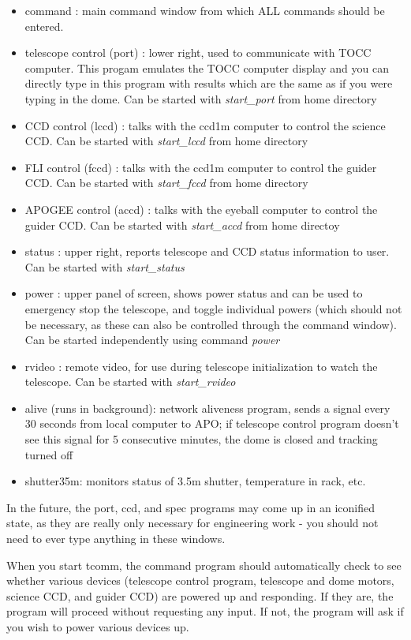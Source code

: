 \documentclass[10pt]{report}
\begin{document}
\begin{itemize}
\item command : main command window from which ALL commands should
              be entered.
\item telescope control (port) : lower right, used to communicate with TOCC
              computer. This progam emulates the TOCC computer display and
              you can directly type in this program with results which are
              the same as if you were typing in the dome. Can be started with
              \textit{start\_port} from home directory
\item CCD control (lccd) : talks with the ccd1m computer to control the science CCD. Can be started with \textit{start\_lccd} from home directory
\item FLI control (fccd) : talks with the ccd1m computer to control the guider CCD. Can be started with \textit{start\_fccd} from home directory
\item APOGEE control (accd) : talks with the eyeball computer to control the guider CCD. Can be started with \textit{start\_accd} from home directoy
\item status : upper right, reports telescope and CCD status information to user. Can be started with \textit{start\_status}
\item power : upper panel of screen, shows power status and can be used to
emergency stop the telescope, and toggle individual powers (which should not
be necessary, as these can also be controlled through the command window).
Can be started independently using command \textit{power}
\item rvideo : remote video, for use during telescope initialization to watch
the telescope. Can be started with \textit{start\_rvideo}
\item alive (runs in background): network aliveness program, sends a signal 
every 30 seconds from
local computer to APO; if telescope control program doesn't see this signal
for 5 consecutive minutes, the dome is closed and tracking turned off
\item shutter35m: monitors status of 3.5m shutter, temperature in rack, etc.
\end{itemize}

In the future, the port, ccd, and spec programs may come up in an iconified
state, as they are really only necessary for engineering work - you should
not need to ever type anything in these windows.

When you start tcomm, the command program should automatically check to 
see whether various devices (telescope control program, telescope and dome
motors, science CCD, and guider CCD) are powered up and responding. If
they are, the program will proceed without requesting any input. If not,
the program will ask if you wish to power various devices up. 
\end{document}
